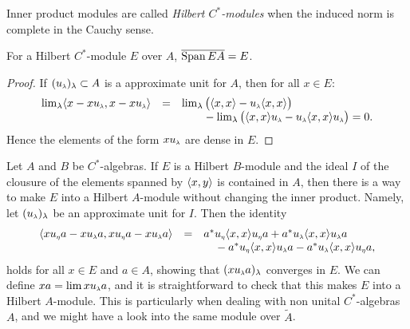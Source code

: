 \begin{definicao}
Inner product modules are called \textit{Hilbert \ensuremath{C^*}-modules} when the induced norm is complete in the Cauchy sense.
\end{definicao}

\begin{proposicao}\label{prop: EA = E}
For a Hilbert $C^*$-module $E$ over $A$, $\overline{\operatorname{Span} EA} = E$.
\end{proposicao}
\begin{proof}
If $(\sub u\lambda)_\lambda \subset A$ is a approximate unit for $A$, then for all $x\in E$:
\begin{equation*}
    \begin{array}{rcl}
        \lim_\lambda \inner{x-x\sub u\lambda}{x-x\sub u\lambda} &=& \lim_\lambda\big(\inner xx - \sub u\lambda \inner xx\big)  \\
        & & \hphantom{\lim_\lambda}- \lim_{\lambda} \big(\inner xx\sub u\lambda - \sub u\lambda \inner xx\sub u\lambda \big) = 0.
    \end{array}
\end{equation*}
Hence the elements of the form $x\sub u\lambda$ are dense in $E$. 
\end{proof}

\begin{observacao}\label{obs: tornar um R-modulo em um K-modulo}
Let $A$ and $B$ be $C^*$-algebras. If $E$ is a Hilbert $B$-module and the ideal $I$ of the clousure of the elements spanned by $\langle {x},{y}\rangle$ is contained in $A$, then there is a way to make $E$ into a Hilbert $A$-module without changing the inner product. Namely, let $(\sub u\lambda)_\lambda$ be an approximate unit for $I$. Then the identity
\begin{equation*}
\begin{array}{rcl}
    \inner{x \sub u\eta a-x \sub u\lambda a}{x \sub u\eta a-x \sub u\lambda a} &=& 
a^* \sub u\eta \inner xx \sub u\eta a+a^* \sub u\lambda \inner xx \sub u\lambda a \\ & & \hphantom{a^*}-a^* \sub u\eta \inner xx \sub u\lambda a-a^* \sub u\lambda \inner xx \sub u\eta a,
\end{array}
\end{equation*}
holds for all $x\in E$ and $a\in A$, showing that $(x\sub u\lambda a)_\lambda$ converges in $E$. We can define $x a=\lim x \sub u{\lambda} a$, and it is straightforward to check that this makes $E$ into a Hilbert $A$-module. This is particularly when dealing with non unital $C^*$-algebras $A$, and we might have a look into the same module over $\widetilde A$.
\end{observacao}

